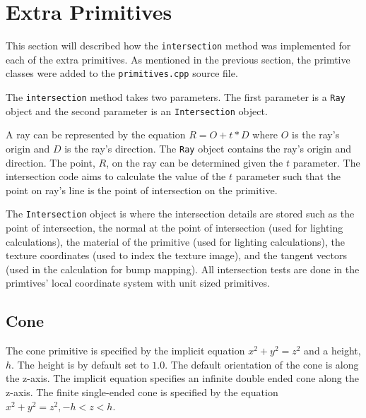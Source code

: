 \section{Extra Primitives}

This section will described how the \verb|intersection| method was
implemented for each of the extra primitives. As mentioned in the previous
section, the primtive classes were added to the \verb|primitives.cpp| source 
file.

The \verb|intersection| method takes two parameters. The first parameter is a
\verb|Ray| object and the second parameter is an \verb|Intersection| object. 

A ray can be represented by the equation $R = O + t*D$ where $O$ is the ray's 
origin and $D$ is the ray's direction. The \verb|Ray| object contains the ray's 
origin and direction. The point, $R$, on the ray can be determined given the $t$ 
parameter. The intersection code aims to calculate the value of the $t$ 
parameter such that the point on ray's line is the point of intersection on the 
primitive. 

The \verb|Intersection| object is where the intersection details are
stored such as the point of intersection, the normal at the point of
intersection (used for lighting calculations), the material of the primitive
(used for lighting calculations), the texture coordinates (used to index the
texture image), and the tangent vectors (used in the calculation for bump
mapping). All intersection tests are done in the primtives' local coordinate
system with unit sized primitives.

\subsection*{Cone}
The cone primitive is specified by the implicit equation $x^2 + y^2 = z^2$ and a
height, $h$. The height is by default set to $1.0$. The default orientation of 
the cone is along the z-axis. The implicit equation specifies an infinite double 
ended cone along the z-axis. The finite single-ended cone is specified by the
equation $x^2 + y^2 = z^2, -h < z < h$. 

